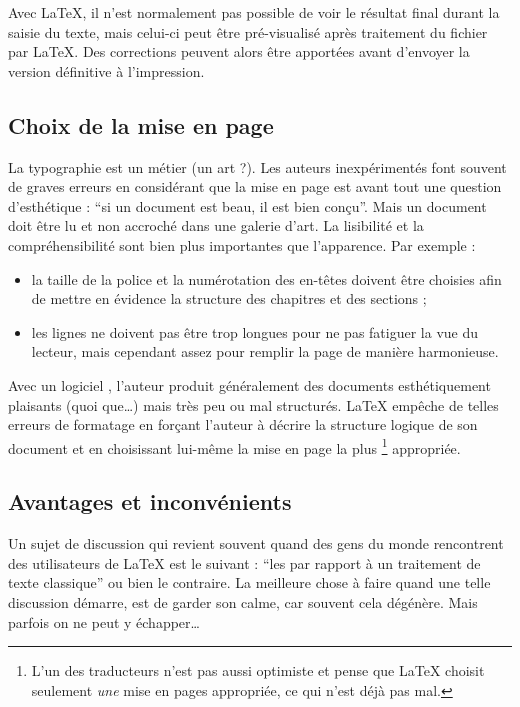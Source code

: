 Avec \LaTeX{}, il n'est normalement pas possible de voir le résultat
final durant la saisie du texte, mais celui-ci peut être
pré-visualisé après traitement du fichier par \LaTeX{}. Des corrections
peuvent alors être apportées avant d'envoyer la version définitive
à l'impression.

\subsection{Choix de la mise en page}

La typographie est un métier (un art ?). Les auteurs inexpérimentés
font souvent de graves erreurs en considérant que la mise en page est
avant tout une question d'esthétique : \enquote{si un document est beau, il
est bien conçu}. Mais un document doit être lu et non accroché dans
une galerie d'art. La lisibilité et la compréhensibilité sont bien
plus importantes que l'apparence. Par exemple :
\begin{itemize}
\item la taille de la police et la numérotation des en-têtes doivent
      être choisies afin de mettre en évidence la structure des
      chapitres et des sections ;
\item les lignes ne doivent pas être trop longues pour ne pas fatiguer
      la vue du lecteur, mais cependant assez pour remplir la page de manière
      harmonieuse.
\end{itemize}

Avec un logiciel , l'auteur produit généralement des
documents esthétiquement plaisants (quoi que\dots) mais très peu ou
mal structurés. \LaTeX{} empêche de telles erreurs de formatage en
forçant l'auteur à décrire la structure logique de son document et en
choisissant lui-même la mise en page la plus
\footnote{L'un des traducteurs n'est pas aussi optimiste et pense que \LaTeX{}
  choisit seulement \emph{une} mise en pages appropriée, ce qui n'est déjà pas
  mal. \NdT} appropriée.


\subsection{Avantages et inconvénients}

Un sujet de discussion qui  revient souvent quand des gens du monde
 rencontrent des utilisateurs de \LaTeX{} est le
suivant : \enquote{les  par rapport à un
traitement de texte classique} ou bien le contraire.
La meilleure chose à faire quand une telle discussion démarre, est de
garder son calme, car souvent cela dégénère. Mais parfois on ne peut y
échapper\dots

